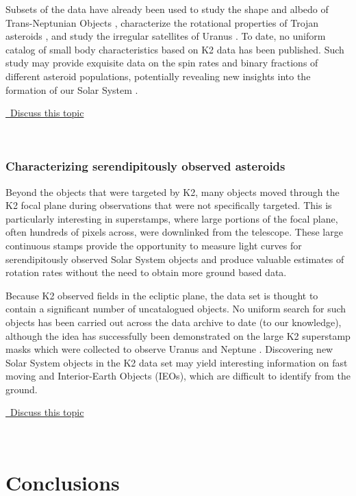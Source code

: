 \documentclass[modern]{aastex62}
\newcommand{\commentlink}[1]{\href{https://github.com/KeplerGO/ScientificOpportunities/issues/#1}{\sc \faExternalLink\ Discuss this topic}\,\,}
\begin{document}
Subsets of the data have already been used to study the shape and albedo of Trans-Neptunian Objects \citep{pal2015,pal2016}, characterize the rotational properties of Trojan asteroids \citep{ryan2017,szabo2017}, and study the irregular satellites of Uranus \citep{farkas2017}.
To date, no uniform catalog of small body characteristics based on K2 data has been published. Such study may provide exquisite data on the spin rates and binary fractions of different asteroid populations, potentially revealing new insights into the formation of our Solar System \citep{ryan2017}.
\\
\begin{center}
\commentlink{20}
\end{center}
\ \\

\subsubsection{Characterizing serendipitously observed asteroids}
Beyond the objects that were targeted by K2, many objects moved through the K2 focal plane during observations that were not specifically targeted. This is particularly interesting in superstamps, where large portions of the focal plane, often hundreds of pixels across, were downlinked from the telescope. These large continuous stamps provide the opportunity to measure light curves for serendipitously observed Solar System objects and produce valuable estimates of rotation rates without the need to obtain more ground based data. 

Because K2 observed fields in the ecliptic plane, the data set is thought to contain a significant number of uncatalogued objects. No uniform search for such objects has been carried out across the data archive to date (to our knowledge), although the idea has successfully been demonstrated on the large K2 superstamp masks which were collected to observe Uranus and Neptune \citep{szabo2016,molnar2018}. Discovering new Solar System objects in the K2 data set may yield interesting information on fast moving and Interior-Earth Objects (IEOs), which are difficult to identify from the ground. 
\\
\begin{center}
\commentlink{21}
\end{center}
\ \\


\section{Conclusions}
\end{document}
